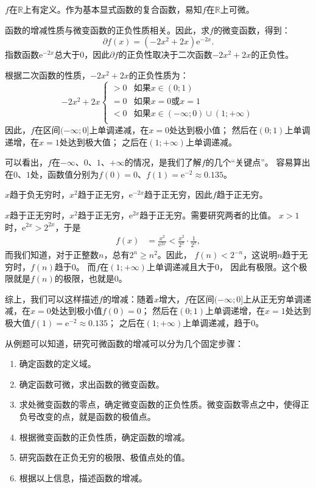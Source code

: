 \documentclass[12pt,UTF8]{ctexbook}
\begin{document}
\begin{so}
    $f$在$\mathbb{R}$上有定义。作为基本显式函数的复合函数，易知$f$在$\mathbb{R}$上可微。

    函数的增减性质与微变函数的正负性质相关。因此，求$f$的微变函数，得到：
    $$ \partial f(x) = (-2x^2 + 2x) \mathrm{e}^{-2x}.$$
    指数函数$ \mathrm{e}^{-2x} $总大于$0$，因此$ \partial f $的正负性取决于二次函数$-2x^2 + 2x$的正负性。
    
    根据二次函数的性质，$-2x^2 + 2x$的正负性质为：
    $$ -2x^2 + 2x \left\{
        \begin{array}{cl}
            > 0 & \mbox{如果}x \in (0; 1) \\
            = 0 & \mbox{如果}x = 0 \mbox{或} x = 1 \\
            < 0 & \mbox{如果}x \in (-\infty; 0)\cup (1; +\infty)\\
        \end{array}\right.
    $$
    因此，$f$在区间$(-\infty; 0]$上单调递减，在$x = 0$处达到极小值；
    然后在$(0; 1)$上单调递增，在$x = 1$处达到极大值；
    之后在$(1; +\infty)$上单调递减。

    可以看出，$f$在$-\infty$、$0$、$1$、$+\infty$的情况，是我们了解$f$的几个“关键点”。
    容易算出在$0$、$1$处，函数值分别为$f(0) = 0$、$f(1) = \mathrm{e}^{-2} \approx 0.135$。
    
    $x$趋于负无穷时，$x^2$趋于正无穷，$\mathrm{e}^{-2x}$趋于正无穷，因此$f$趋于正无穷。

    $x$趋于正无穷时，$x^2$趋于正无穷，$\mathrm{e}^{2x}$趋于正无穷。需要研究两者的比值。
    $x > 1$时，$\mathrm{e}^{2x} > 2^{2x}$，于是
    \begin{align*}
        f(x) &= \frac{x^2}{\mathrm{e}^{2x}} < \frac{x^2}{2^x} \cdot \frac{1}{2^x}, 
    \end{align*} 
    而我们知道，对于正整数$n$，总有$2^n \geqslant n^2$。因此，
    $f(n) < 2^{-n}$，这说明$n$趋于无穷时，$f(n)$趋于$0$。
    而$f$在$(1;+\infty)$上单调递减且大于$0$，
    因此有极限。这个极限就是$f(n)$的极限，也就是$0$。

    综上，我们可以这样描述$f$的增减：随着$x$增大，$f$在区间$(-\infty; 0]$上从正无穷单调递减，在$x = 0$处达到极小值$f(0) = 0$；
    然后在$(0; 1)$上单调递增，在$x = 1$处达到极大值$f(1) = \mathrm{e}^{-2} \approx 0.135$；
    之后在$(1; +\infty)$上单调递减，趋于$0$。
\end{so}

从例题可以知道，研究可微函数的增减可以分为几个固定步骤：
\begin{enumerate}
    \item 确定函数的定义域。
    \item 确定函数可微，求出函数的微变函数。
    \item 求处微变函数的零点，确定微变函数的正负性质。微变函数零点之中，使得正负号改变的点，就是函数的极值点。
    \item 根据微变函数的正负性质，确定函数的增减。
    \item 研究函数在正负无穷的极限、极值点处的值。
    \item 根据以上信息，描述函数的增减。
\end{enumerate}
\end{document}
